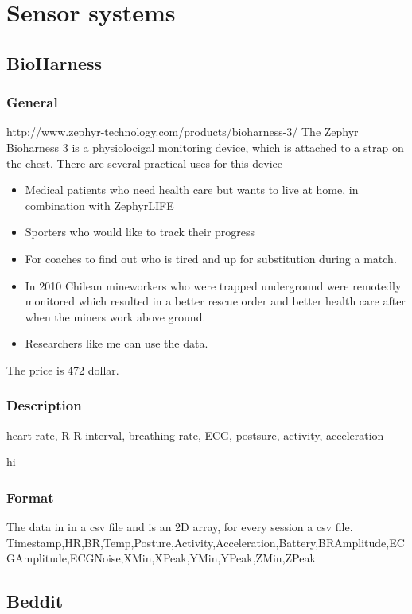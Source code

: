 \section{Sensor systems}
	\subsection{BioHarness}
		\subsubsection{General}
			http://www.zephyr-technology.com/products/bioharness-3/	
			The Zephyr Bioharness 3 \cite{bioharness} is a physiolocigal monitoring device, which is attached to a strap on the chest. There are several practical uses for this device 
			\begin{itemize}
				\item Medical patients who need health care but wants to live at home, in combination with ZephyrLIFE \texttrademark \cite{bhpatients}
				\item Sporters who would like to track their progress 
				\item For coaches to find out who is tired and up for substitution during a match. \cite{bhsport}
				\item In 2010 Chilean mineworkers who were trapped underground were remotedly monitored which resulted in a better rescue order and better health care after when the miners work above ground. \cite{chile}
				\item Researchers like me can use the data.
			\end{itemize}
			The price is 472 dollar.
		
		\subsubsection{Description}
			heart rate, R-R interval, breathing rate, ECG, postsure, activity, acceleration

			hi
		\subsubsection{Format}
		The data in in a csv file and is an 2D array, for every session a csv file.
		Timestamp,HR,BR,Temp,Posture,Activity,Acceleration,Battery,BRAmplitude,ECGAmplitude,ECGNoise,XMin,XPeak,YMin,YPeak,ZMin,ZPeak
	\subsection{Beddit}
